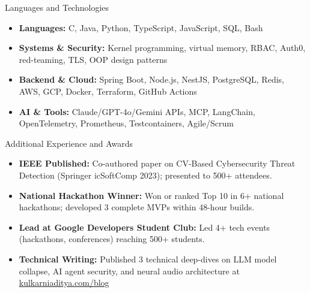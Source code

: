 \documentclass[]{mcdowellcv}
\begin{document}
\begin{cvsection}{Languages and Technologies}
  \begin{cvsubsection}{}{}{}
    \begin{itemize}
      \item \textbf{Languages:} C, Java, Python, TypeScript, JavaScript, SQL, Bash
      \item \textbf{Systems \& Security:} Kernel programming, virtual memory, RBAC, Auth0, red-teaming, TLS, OOP design patterns
      \item \textbf{Backend \& Cloud:} Spring Boot, Node.js, NestJS, PostgreSQL, Redis, AWS, GCP, Docker, Terraform, GitHub Actions
      \item \textbf{AI \& Tools:} Claude/GPT-4o/Gemini APIs, MCP, LangChain, OpenTelemetry, Prometheus, Testcontainers, Agile/Scrum
    \end{itemize}
  \end{cvsubsection}
\end{cvsection}

\begin{cvsection}{Additional Experience and Awards}
  \begin{cvsubsection}{}{}{}
    \begin{itemize}
      \item \textbf{IEEE Published:} Co-authored paper on CV-Based Cybersecurity Threat Detection (Springer icSoftComp 2023); presented to 500+ attendees.
      \item \textbf{National Hackathon Winner:} Won or ranked Top 10 in 6+ national hackathons; developed 3 complete MVPs within 48-hour builds.
      \item \textbf{Lead at Google Developers Student Club:} Led 4+ tech events (hackathons, conferences) reaching 500+ students.
      \item \textbf{Technical Writing:} Published 3 technical deep-dives on LLM model collapse, AI agent security, and neural audio architecture at \href{https://www.kulkarniaditya.com/blog}{kulkarniaditya.com/blog}
    \end{itemize}
  \end{cvsubsection}
\end{cvsection}
\end{document}
